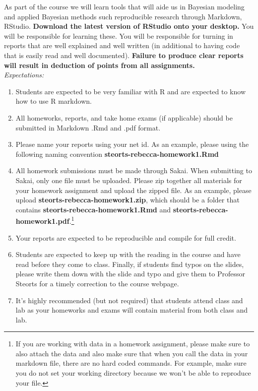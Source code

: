 \documentclass[11pt]{article}
\begin{document}
As part of the course we will learn tools that will aide us in Bayesian modeling and applied Bayesian methods such reproducible research through Markdown, RStudio. \textbf{Download the latest version of RStudio onto your desktop.} You will be responsible for learning these. You will be responsible for turning in reports that are well explained and well written (in additional to having code that is easily read and well documented). \textbf{Failure to produce clear reports will result in deduction of points from all assignments.} 
\\
\newpage
\emph{Expectations:} 
\begin{enumerate}
\item Students are expected to be very familiar with R and are expected to know how to use R markdown. 
\item All homeworks, reports, and take home exams (if applicable) should be submitted in Markdown .Rmd and .pdf format. 
\item Please name your reports using your net id. As an example, please using the following naming convention \textbf{steorts-rebecca-homework1.Rmd} 
\item All homework submissions must be made through Sakai. When submitting to Sakai, only one file must be uploaded. Please zip together all materials for your homework assignment and upload the zipped file. As an example, please upload \textbf{steorts-rebecca-homework1.zip}, which should be a folder that contains \textbf{steorts-rebecca-homework1.Rmd}  and \textbf{steorts-rebecca-homework1.pdf}.\footnote{If you are working with data in a homework assignment, please make sure to also attach the data and also make sure that when you call the data in your markdown file, there are no hard coded commands. For example, make sure you do not set your working directory because we won't be able to reproduce your file.}
\item Your reports are expected to be reproducible and compile for full credit. 
\item Students are expected to keep up with the reading in the course and have read before they come to class. Finally, if students find typos on the slides, please write them down with the slide and typo and give them to Professor Steorts for a timely correction to the course webpage.  
\item It's highly recommended (but not required) that students attend class and lab as your homeworks and exams will contain material from both class and lab. 
\end{enumerate}
\end{document}
